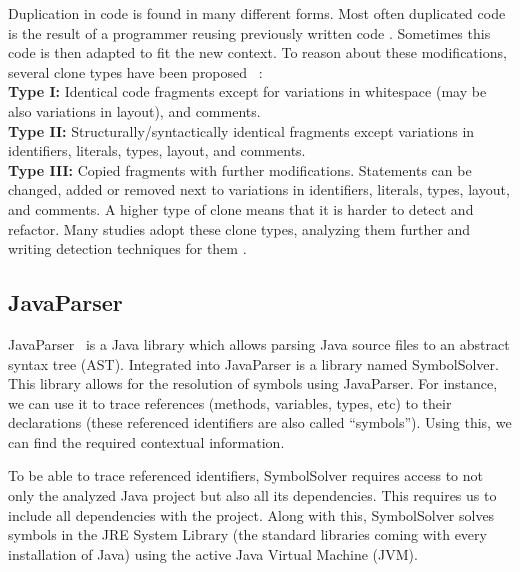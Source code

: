 \documentclass[conference]{IEEEtran}
\begin{document}
Duplication in code is found in many different forms. Most often duplicated code is the result of a programmer reusing previously written code \cite{haefliger2008code, baxter1998clone}. Sometimes this code is then adapted to fit the new context. To reason about these modifications, several clone types have been proposed%
~\cite{roy2007survey}:\\
\textbf{Type I:} Identical code fragments except for variations in whitespace (may be also variations in layout), and comments.\\
\textbf{Type II:} Structurally/syntactically identical fragments except variations in identifiers, literals, types, layout, and comments.\\
\textbf{Type III:} Copied fragments with further modifications. Statements can be changed, added or removed next to variations in identifiers, literals, types, layout, and comments.
A higher type of clone means that it is harder to detect and refactor. Many studies adopt these clone types, analyzing them further and writing detection techniques for them \cite{sajnani2016sourcerercc, kodhai2010detection, van2019novel}.

\subsection{JavaParser}
JavaParser~\cite{tomassetti2017javaparser} is a Java library which allows parsing Java source files to an abstract syntax tree (AST). Integrated into JavaParser is a library named SymbolSolver. This library allows for the resolution of symbols using JavaParser. For instance, we can use it to trace references (methods, variables, types, etc) to their declarations (these referenced identifiers are also called ``symbols''). Using this, we can find the required contextual information.

To be able to trace referenced identifiers, SymbolSolver requires access to not only the analyzed Java project but also all its dependencies. This requires us to include all dependencies with the project. Along with this, SymbolSolver solves symbols in the JRE System Library (the standard libraries coming with every installation of Java) using the active Java Virtual Machine (JVM). %
\end{document}
